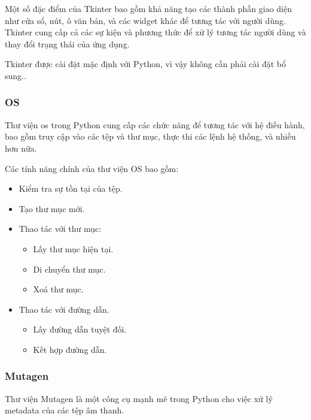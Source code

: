 \documentclass[a4paper]{article}
\begin{document}
      \hspace*{0.5cm} Một số đặc điểm của Tkinter bao gồm khả năng tạo các thành phần giao diện như cửa sổ, nút, ô văn bản, và các widget khác để tương tác với người dùng. Tkinter cung cấp cả các sự kiện và phương thức để xử lý tương tác người dùng và thay đổi trạng thái của ứng dụng.

      \hspace*{0.5cm} Tkinter được cài đặt mặc định với Python, vì vậy không cần phải cài đặt bổ sung..
\subsubsection{OS}
     \hspace*{0.5cm} Thư viện os trong Python cung cấp các chức năng để tương tác với hệ điều hành, bao gồm truy cập vào các tệp và thư mục, thực thi các lệnh hệ thống, và nhiều hơn nữa.
     
     \hspace*{0.5cm} Các tính năng chính của thư viện OS bao gồm:
      \begin{itemize}
          \item Kiểm tra sự tồn tại của tệp.
          \item Tạo thư mục mới.
          \item Thao tác với thư mục:
          \begin{itemize}
              \item Lấy thư mục hiện tại.
              \item Di chuyển thư mục.
              \item Xoá thư mục.
          \end{itemize}
          \item Thao tác với đường dẫn.
          \begin{itemize}
              \item Lấy đường dẫn tuyệt đối.
              \item Kết hợp đường dẫn.
          \end{itemize}
      \end{itemize}
      
\subsubsection{Mutagen}
     \hspace*{0.5cm} Thư viện Mutagen là một công cụ mạnh mẽ trong Python cho việc xử lý metadata của các tệp âm thanh.
     
\end{document}

